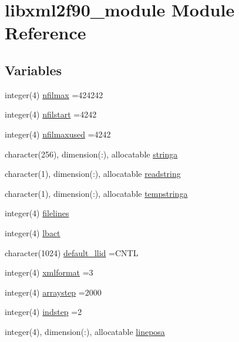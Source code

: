 \hypertarget{namespacelibxml2f90__module}{}\section{libxml2f90\+\_\+module Module Reference}
\label{namespacelibxml2f90__module}
\subsection*{Variables}
\begin{DoxyCompactItemize}
\item 
integer(4) \hyperlink{namespacelibxml2f90__module_ae803c4d10ecfbdc0b6624c004764524e}{nfilmax} =424242
\item 
integer(4) \hyperlink{namespacelibxml2f90__module_a76bbe7c27297a807f15421a654d7ca6b}{nfilstart} =4242
\item 
integer(4) \hyperlink{namespacelibxml2f90__module_a217fb75c146107a9cf2983b658274832}{nfilmaxused} =4242
\item 
character(256), dimension(\+:), allocatable \hyperlink{namespacelibxml2f90__module_ab661dc207b668f91bdee9a3efea3dd49}{stringa}
\item 
character(1), dimension(\+:), allocatable \hyperlink{namespacelibxml2f90__module_a791c6344181b9375ed7fc4470f4554aa}{readstring}
\item 
character(1), dimension(\+:), allocatable \hyperlink{namespacelibxml2f90__module_a55e059defbab12f54d54b8f44ad84777}{tempstringa}
\item 
integer(4) \hyperlink{namespacelibxml2f90__module_a63c8792c8a009d1875c66340984b0879}{filelines}
\item 
integer(4) \hyperlink{namespacelibxml2f90__module_a958e698155df02283f763fc986f1785f}{lbact}
\item 
character(1024) \hyperlink{namespacelibxml2f90__module_a2dc8e61fe0a8b9c60b5197984e7b30ae}{default\+\_\+llid} =\textquotesingle{}C\+N\+T\+L\textquotesingle{}
\item 
integer(4) \hyperlink{namespacelibxml2f90__module_a6e7d9498a3938eb57c8ff2020118098e}{xmlformat} =3
\item 
integer(4) \hyperlink{namespacelibxml2f90__module_a03a53e403791ec1e112a71f5f2831522}{arraystep} =2000
\item 
integer(4) \hyperlink{namespacelibxml2f90__module_aef9ff21f71177c723fbac94eeafcb733}{indstep} =2
\item 
integer(4), dimension(\+:), allocatable \hyperlink{namespacelibxml2f90__module_ad86b3bf7c2ae6ea6856befb154df888f}{lineposa}

\end{DoxyCompactItemize}
